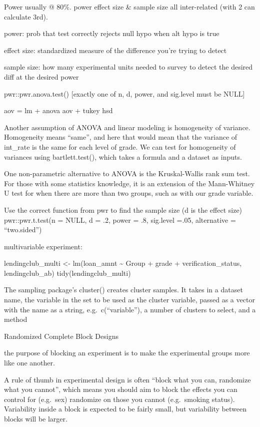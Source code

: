 \documentclass[]{book}
\begin{document}
Power usually @ 80\%. power effect size \& sample size all inter-related (with 2 can calculate 3rd).

power: prob that test correctly rejects null hypo when alt hypo is true

effect size: standardized measure of the difference you're trying to detect

sample size: how many experimental units needed to survey to detect the desired diff at the desired power

pwr::pwr.anova.test() {[}exactly one of n, d, power, and sig.level must be NULL{]}

aov = lm + anova \textbar{} aov + tukey hsd

Another assumption of ANOVA and linear modeling is homogeneity of variance. Homogeneity means ``same'', and here that would mean that the variance of int\_rate is the same for each level of grade. We can test for homogeneity of variances using bartlett.test(), which takes a formula and a dataset as inputs.

One non-parametric alternative to ANOVA is the Kruskal-Wallis rank sum test. For those with some statistics knowledge, it is an extension of the Mann-Whitney U test for when there are more than two groups, such as with our grade variable.

Use the correct function from pwr to find the sample size (d is the effect size)
pwr::pwr.t.test(n = NULL, d = .2, power = .8, sig.level =.05, alternative = ``two.sided'')

multivariable experiment:

lendingclub\_multi \textless{}- lm(loan\_amnt \textasciitilde{} Group + grade + verification\_status, lendingclub\_ab)
tidy(lendingclub\_multi)

The sampling package's cluster() creates cluster samples. It takes in a dataset name, the variable in the set to be used as the cluster variable, passed as a vector with the name as a string, e.g.~c(``variable''), a number of clusters to select, and a method

Randomized Complete Block Designs

the purpose of blocking an experiment is to make the experimental groups more like one another.

A rule of thumb in experimental design is often ``block what you can, randomize what you cannot'', which means you should aim to block the effects you can control for (e.g.~sex) randomize on those you cannot (e.g.~smoking status). Variability inside a block is expected to be fairly small, but variability between blocks will be larger.
\end{document}

